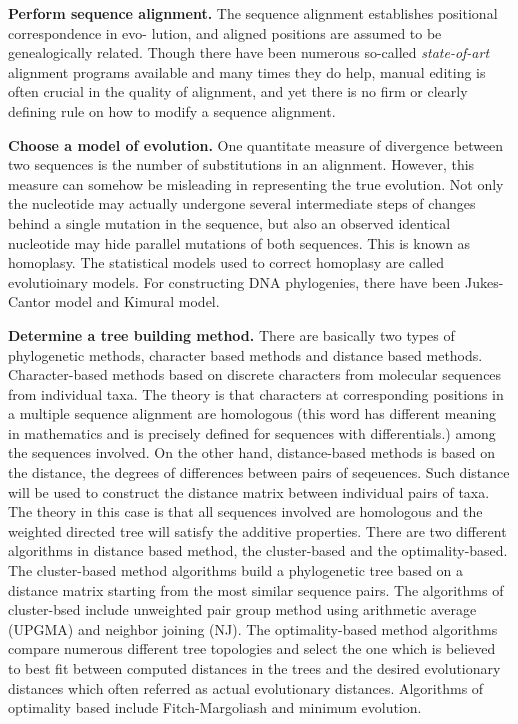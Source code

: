 \textbf{Perform sequence alignment.}
 The sequence alignment establishes positional correspondence 
 in evo- lution, and aligned positions are assumed to be 
 genealogically related. Though there have been numerous 
 so-called \textit{state-of-art} alignment programs available and 
 many times they do help, manual editing is often
 crucial in the quality of alignment, and yet there is 
 no firm or clearly defining rule on how to modify a 
 sequence alignment. 
 
 
 \textbf{Choose a model of evolution.}
  One quantitate measure of divergence between two 
  sequences is the number of substitutions in an alignment. 
  However, this measure can somehow be misleading in 
  representing the true evolution. Not only the nucleotide 
  may actually undergone several intermediate steps of 
  changes behind a single mutation in the sequence, but 
  also an observed identical nucleotide may hide parallel 
  mutations of both sequences. This is known as homoplasy. 
  The statistical models used to correct homoplasy are 
  called evolutioinary models. For constructing DNA 
  phylogenies, there have been Jukes-Cantor model and 
  Kimural model.
  
 
\textbf{Determine a tree building method.}
 There are basically two types of phylogenetic 
 methods, character based methods and distance 
 based methods. Character-based methods based on 
 discrete characters from molecular sequences from 
 individual taxa. The theory is that characters at 
 corresponding positions in a multiple sequence 
 alignment are homologous (this word has different 
 meaning in mathematics and is precisely defined for 
 sequences with differentials.) among the sequences 
 involved. On the other hand, distance-based methods is 
 based on the distance, the degrees of differences between 
 pairs of seqeuences. Such distance will be used to construct 
 the distance matrix between individual pairs of taxa. 
 The theory in this case is that all sequences involved 
 are homologous and the weighted directed tree will 
 satisfy the additive properties. There are two different 
 algorithms in distance based method, the cluster-based 
 and the optimality-based. The cluster-based method 
 algorithms build a phylogenetic tree based on a distance 
 matrix starting from the most similar sequence pairs. 
 The algorithms of cluster-bsed include unweighted pair 
 group method using arithmetic average (UPGMA) and 
 neighbor joining (NJ). The optimality-based method 
 algorithms compare numerous different tree topologies 
 and select the one which is believed to best fit between 
 computed distances in the trees and the desired 
 evolutionary distances which often referred as actual 
 evolutionary distances. Algorithms of optimality based 
 include Fitch-Margoliash and minimum evolution. 

